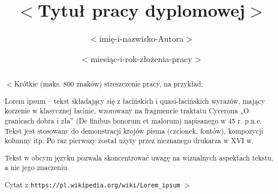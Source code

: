 \documentclass{pracalicmgr}
\author{$<$imię-i-nazwisko-Autora$>$}
\title{$<$Tytuł pracy dyplomowej$>$}
\date{$<$miesiąc-i-rok-złożenia-pracy$>$}
\begin{document}
    \maketitle
    \let\cleardoublepage\clearpage
    
    \begin{abstract}
$<$Krótkie (maks. 800 znaków) streszczenie pracy, na przykład:

Lorem ipsum – tekst składający się z łacińskich i quasi-łacińskich wyrazów, mający korzenie w klasycznej łacinie, wzorowany na fragmencie traktatu Cycerona „O granicach dobra i zła” (De finibus bonorum et malorum) napisanego w 45 r. p.n.e. Tekst jest stosowany do demonstracji krojów pisma (czcionek, fontów), kompozycji kolumny itp. Po raz pierwszy został użyty przez nieznanego drukarza w XVI w.

Tekst w obcym języku pozwala skoncentrować uwagę na wizualnych aspektach tekstu, a nie jego znaczeniu.

Cytat z {\tt https://pl.wikipedia.org/wiki/Lorem\_ipsum}
$>$

     \end{abstract}

%    
%    
%        
%    
%    
\end{document}
